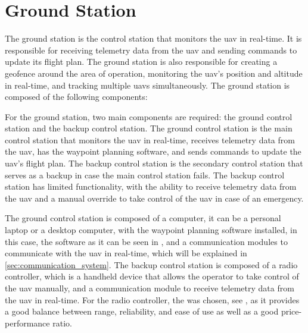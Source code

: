 \section{Ground Station}\label{sec:ground_station}

The ground station is the control station that monitors the \gls{uav} in real-time. It is responsible for receiving telemetry data from the \gls{uav} and sending commands to update its flight plan. The ground station is also responsible for creating a geofence around the area of operation, monitoring the \gls{uav}'s position and altitude in real-time, and tracking multiple \glspl{uav} simultaneously. The ground station is composed of the following components:

For the ground station, two main components are required: the ground control station and the backup control station. The ground control station is the main control station that monitors the \gls{uav} in real-time, receives telemetry data from the \gls{uav}, has the waypoint planning software, and sends commands to update the \gls{uav}'s flight plan. The backup control station is the secondary control station that serves as a backup in case the main control station fails. The backup control station has limited functionality, with the ability to receive telemetry data from the \gls{uav} and a manual override to take control of the \gls{uav} in case of an emergency.

The ground control station is composed of a computer, it can be a personal laptop or a desktop computer, with the waypoint planning software installed, in this case, the  software as it can be seen in , and a communication modules to communicate with the \gls{uav} in real-time, which will be explained in \cref{sec:communication_system}. The backup control station is composed of a radio controller, which is a handheld device that allows the operator to take control of the \gls{uav} manually, and a communication module to receive telemetry data from the \gls{uav} in real-time. For the radio controller, the  was chosen, see , as it provides a good balance between range, reliability, and ease of use as well as a good price-performance ratio.


